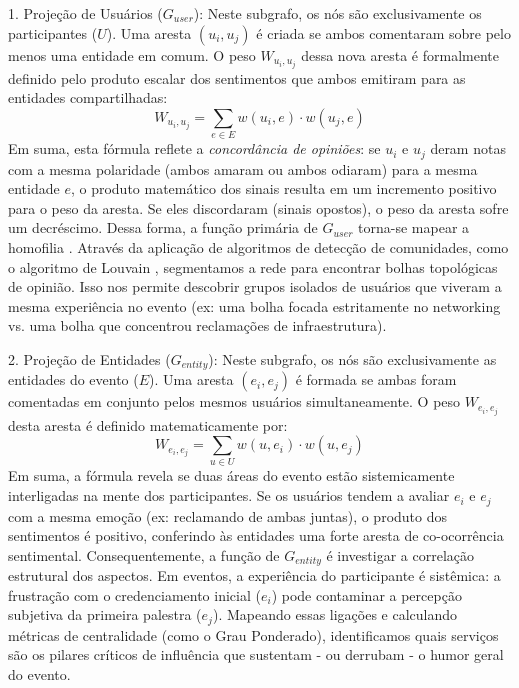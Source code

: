 \documentclass[sigconf]{webmedia}
\begin{document}
1. Projeção de Usuários ($G_{user}$): Neste subgrafo, os nós são exclusivamente os participantes ($U$). Uma aresta $(u_i, u_j)$ é criada se ambos comentaram sobre pelo menos uma entidade em comum. O peso $W_{u_i, u_j}$ dessa nova aresta é formalmente definido pelo produto escalar dos sentimentos que ambos emitiram para as entidades compartilhadas:
\begin{equation}
W_{u_i, u_j} = \sum_{e \in E} w(u_i, e) \cdot w(u_j, e)
\end{equation}
Em suma, esta fórmula reflete a \textit{concordância de opiniões}: se $u_i$ e $u_j$ deram notas com a mesma polaridade (ambos amaram ou ambos odiaram) para a mesma entidade $e$, o produto matemático dos sinais resulta em um incremento positivo para o peso da aresta. Se eles discordaram (sinais opostos), o peso da aresta sofre um decréscimo. Dessa forma, a função primária de $G_{user}$ torna-se mapear a homofilia \cite{easley}. Através da aplicação de algoritmos de detecção de comunidades, como o algoritmo de Louvain \cite{blondel}, segmentamos a rede para encontrar bolhas topológicas de opinião. Isso nos permite descobrir grupos isolados de usuários que viveram a mesma experiência no evento (ex: uma bolha focada estritamente no networking vs. uma bolha que concentrou reclamações de infraestrutura).

2. Projeção de Entidades ($G_{entity}$): Neste subgrafo, os nós são exclusivamente as entidades do evento ($E$). Uma aresta $(e_i, e_j)$ é formada se ambas foram comentadas em conjunto pelos mesmos usuários simultaneamente. O peso $W_{e_i, e_j}$ desta aresta é definido matematicamente por:
\begin{equation}
W_{e_i, e_j} = \sum_{u \in U} w(u, e_i) \cdot w(u, e_j)
\end{equation}
Em suma, a fórmula revela se duas áreas do evento estão sistemicamente interligadas na mente dos participantes. Se os usuários tendem a avaliar $e_i$ e $e_j$ com a mesma emoção (ex: reclamando de ambas juntas), o produto dos sentimentos é positivo, conferindo às entidades uma forte aresta de co-ocorrência sentimental. Consequentemente, a função de $G_{entity}$ é investigar a correlação estrutural dos aspectos. Em eventos, a experiência do participante é sistêmica: a frustração com o credenciamento inicial ($e_i$) pode contaminar a percepção subjetiva da primeira palestra ($e_j$). Mapeando essas ligações e calculando métricas de centralidade (como o Grau Ponderado), identificamos quais serviços são os pilares críticos de influência que sustentam - ou derrubam - o humor geral do evento.
\end{document}
